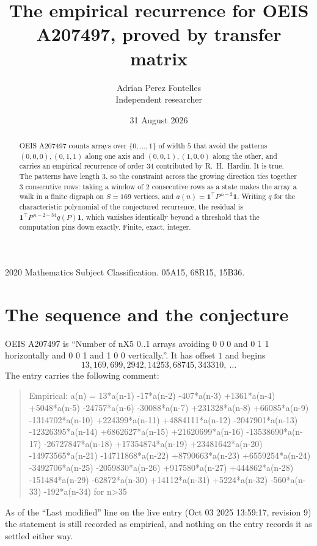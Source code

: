 \documentclass[11pt,a4paper]{article}
\title{The empirical recurrence for OEIS A207497, proved by transfer matrix}
\author{Adrian Perez Fontelles\\ \small Independent researcher}
\date{31 August 2026}
\theoremstyle{plain}
\theoremstyle{definition}
\begin{document}
\maketitle

\begin{abstract}
OEIS A207497 counts arrays over $\{0,\dots,1\}$ of width $5$ that avoid the patterns
$(0,0,0), (0,1,1)$ along one axis and $(0,0,1), (1,0,0)$ along the other, and carries an empirical recurrence of
order $34$ contributed by R.~H.~Hardin. It is true. The patterns have length $3$, so
the constraint across the growing direction ties together $3$ consecutive rows: taking a
window of $2$ consecutive rows as a state makes the array a walk in a finite digraph
on $S=169$ vertices, and $a(n)=\mathbf{1}^{\!\top}P^{\,n-2}\mathbf{1}$. Writing $q$
for the characteristic polynomial of the conjectured recurrence, the residual is
$\mathbf{1}^{\!\top}P^{\,n-2-34}q(P)\mathbf{1}$, which vanishes identically
beyond a threshold that the computation pins down exactly. Finite, exact, integer.
\end{abstract}

\noindent\small 2020 Mathematics Subject Classification. 05A15, 68R15, 15B36.\normalsize

\section{The sequence and the conjecture}

OEIS A207497 is ``Number of nX5 0..1 arrays avoiding 0 0 0 and 0 1 1 horizontally and 0 0 1 and 1 0 0 vertically.''. It has offset
$1$ and begins
\[
13, 169, 699, 2942, 14253, 68745, 343310,\ \dots
\]
The entry carries the following comment:
\begin{quote}\small
Empirical: a(n) = 13*a(n-1) -17*a(n-2) -407*a(n-3) +1361*a(n-4) +5048*a(n-5) -24757*a(n-6) -30088*a(n-7) +231328*a(n-8) +66085*a(n-9) -1314702*a(n-10) +224399*a(n-11) +4884111*a(n-12) -2047901*a(n-13) -12326395*a(n-14) +6862627*a(n-15) +21620699*a(n-16) -13538690*a(n-17) -26727847*a(n-18) +17354874*a(n-19) +23481642*a(n-20) -14973565*a(n-21) -14711868*a(n-22) +8790663*a(n-23) +6559254*a(n-24) -3492706*a(n-25) -2059830*a(n-26) +917580*a(n-27) +444862*a(n-28) -151484*a(n-29) -62872*a(n-30) +14112*a(n-31) +5224*a(n-32) -560*a(n-33) -192*a(n-34) for n>35
\end{quote}
As of the ``Last modified'' line on the live entry (Oct 03 2025 13:59:17, revision
9) the statement is still recorded as empirical, and nothing on the entry
records it as settled either way.
\end{document}
